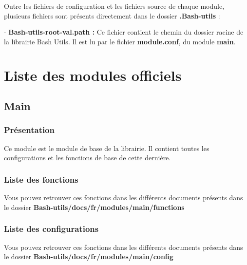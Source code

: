 \documentclass[a4paper,10pt]{article}
\begin{document}
  Outre les fichiers de configuration et les fichiers source de chaque module, plusieurs fichiers sont présents directement dans le dossier \textbf{\color{lime}.Bash-utils\color{white}} :\linebreak

  - \textbf{\color{lime}Bash-utils-root-val.path\color{white} :} Ce fichier contient le chemin du dossier racine de la librairie Bash Utils. Il est lu par le fichier \textbf{\color{lime}module.conf\color{white}}, du module \color{lime}\textbf{main\color{white}}.

 \color{red}
 \section{Liste des modules officiels}\color{white}

  \color{green}
  \subsection{Main}\color{white}

  \color{blue}
  \subsubsection{Présentation}\color{white}
  Ce module est le module de base de la librairie. Il contient toutes les configurations et les fonctions de base de cette dernière.

  \color{blue}
  \subsubsection{Liste des fonctions}\color{white}
  Vous pouvez retrouver ces fonctions dans les différents documents présents dans le dossier \textbf{\color{lime}Bash-utils/docs/fr/modules/main/functions\color{white}}

  \color{blue}
  \subsubsection{Liste des configurations}\color{white}
  Vous pouvez retrouver ces fonctions dans les différents documents présents dans le dossier \textbf{\color{lime}Bash-utils/docs/fr/modules/main/config\color{white}}
    
\end{document}
